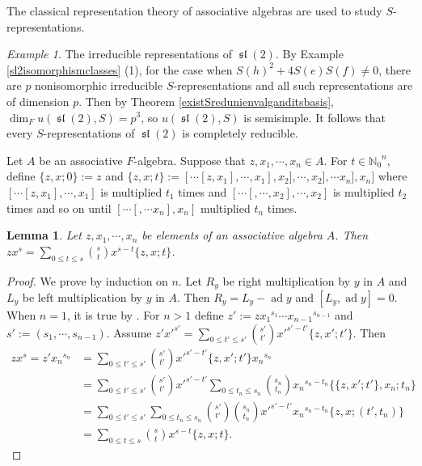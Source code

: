 \documentclass[12pt,MSc]{muthesis_2023}
\theoremstyle{plain}%
\newtheorem{Lemma}[FactCounter]{Lemma} %
\theoremstyle{definition}
\theoremstyle{remark}
\newtheorem{Example}[FactCounter]{Example} %
\DeclareMathOperator{\ad}{ad}
\DeclareMathOperator{\Sl}{\mathfrak{sl}}
\begin{document}
The classical representation theory of associative algebras are used to study $S$-representations.

\begin{Example}
The irreducible representations of $\Sl(2)$. By Example \ref{sl2isomorphismclasses} (1), for the case when ${S(h)}^2+4S(e)S(f)\neq 0$, there are $p$ nonisomorphic irreducible $S$-representations and all such representations are of dimension $p$. Then by Theorem \ref{existSredunienvalganditsbasis}, $\dim_F u(\Sl(2), S)=p^3$, so $u(\Sl(2), S)$ is semisimple. It follows that every $S$-representations of $\Sl(2)$ is completely reducible.
\end{Example}

Let $A$ be an associative $F$-algebra. Suppose that $z, x_1,\cdots, x_n \in A$. For $t\in {\mathbb{N}_0}^n$, define $\{z,x;0\}:=z$ and $\{z,x;t\}:=[\cdots[z,x_1],\cdots, x_1], x_2],\cdots, x_2],\cdots x_n], x_n]$ where $[\cdots[z,x_1],\cdots, x_1]$ is multiplied $t_1$ times and $[\cdots[, \cdots, x_2],\cdots, x_2]$ is multiplied $t_2$ times and so on until $[\cdots[,\cdots x_n], x_n]$ multiplied $t_n$ times.

\begin{Lemma}\label{zxsexpension}
Let $z, x_1, \cdots, x_n$ be elements of an associative algebra $A$. Then $zx^s=\sum_{0\leq t\leq s}\binom{s}{t}x^{s-t}\{z,x;t\}$.

\end{Lemma}

\begin{proof}
We prove by induction on $n$. Let $R_y$ be right multiplication by $y$ in $A$ and $L_y$ be left multiplication by $y$ in $A$. Then $R_y=L_y-\ad y$ and $[L_y, \ad y]=0$. When $n=1$, it is true by    . For $n>1$ define $z':=z{x_1}^{s_1}\cdots {x_{n-1}}^{s_{n-1}}$ and $s':=(s_1,\cdots, s_{n-1})$. Assume $z'{x'}^{s'}=\sum_{0\leq t'\leq s'}\binom{s'}{t'}{x'}^{s'-t'}\{z, x'; t'\}$. Then 
\begin{align*}
zx^s=z'{x_n}^{s_n}&=\sum_{0\leq t'\leq s'}\binom{s'}{t'}{x'}^{s'-t'}\{z,x';t'\}{x_n}^{s_n}\\
&=\sum_{0\leq t'\leq s'}\binom{s'}{t'}{x'}^{s'-t'}\sum_{0\leq t_n\leq s_n}\binom{s_n}{t_n}{x_n}^{s_n-t_n}\{\{z,x';t'\}, x_n ; t_n\}\\
&=\sum_{0\leq t'\leq s'}\sum_{0\leq t_n\leq s_n}\binom{s'}{t'}\binom{s_n}{t_n}{x'}^{s'-t'}{x_n}^{s_n-t_n}\{z, x ; (t', t_n)\}\\
&=\sum_{0\leq t\leq s}\binom{s}{t}x^{s-t}\{z,x;t\}.
\end{align*}
\end{proof}
\end{document}
